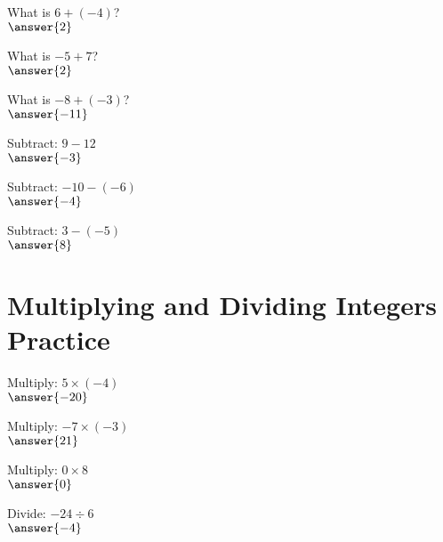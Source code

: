 \documentclass{ximera}
\begin{document}
\begin{problem}
What is $6 + (-4)$?\\
$\answer{2}$
\end{problem}

\begin{problem}
What is $-5 + 7$?\\
$\answer{2}$
\end{problem}

\begin{problem}
What is $-8 + (-3)$?\\
$\answer{-11}$
\end{problem}

\begin{problem}
Subtract: $9 - 12$\\
$\answer{-3}$
\end{problem}

\begin{problem}
Subtract: $-10 - (-6)$\\
$\answer{-4}$
\end{problem}

\begin{problem}
Subtract: $3 - (-5)$\\
$\answer{8}$
\end{problem}



\section*{Multiplying and Dividing Integers Practice}

\begin{problem}
Multiply: $5 \times (-4)$\\
$\answer{-20}$
\end{problem}

\begin{problem}
Multiply: $-7 \times (-3)$\\
$\answer{21}$
\end{problem}

\begin{problem}
Multiply: $0 \times 8$\\
$\answer{0}$
\end{problem}

\begin{problem}
Divide: $-24 \div 6$\\
$\answer{-4}$
\end{problem}
\end{document}
